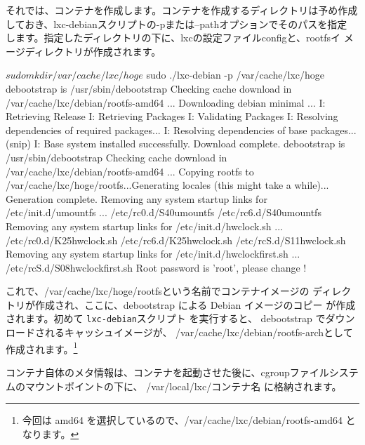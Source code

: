 \documentclass[mingoth,a4paper]{jsarticle}
\begin{document}
それでは、コンテナを作成します。コンテナを作成するディレクトリは予め作成
しておき、lxc-debianスクリプトの-pまたは--pathオプションでそのパスを指定
します。指定したディレクトリの下に、lxcの設定ファイルconfigと、rootfsイ
メージディレクトリが作成されます。

\begin{commandline}
$ sudo mkdir /var/cache/lxc/hoge
$ sudo ./lxc-debian -p /var/cache/lxc/hoge
debootstrap is /usr/sbin/debootstrap
Checking cache download in /var/cache/lxc/debian/rootfs-amd64 ... 
Downloading debian minimal ...
I: Retrieving Release
I: Retrieving Packages
I: Validating Packages
I: Resolving dependencies of required packages...
I: Resolving dependencies of base packages...
(snip)
I: Base system installed successfully.
Download complete.
debootstrap is /usr/sbin/debootstrap
Checking cache download in /var/cache/lxc/debian/rootfs-amd64 ... 
Copying rootfs to /var/cache/lxc/hoge/rootfs...Generating locales (this might take a while)...
Generation complete.
 Removing any system startup links for /etc/init.d/umountfs ...
   /etc/rc0.d/S40umountfs
   /etc/rc6.d/S40umountfs
 Removing any system startup links for /etc/init.d/hwclock.sh ...
   /etc/rc0.d/K25hwclock.sh
   /etc/rc6.d/K25hwclock.sh
   /etc/rcS.d/S11hwclock.sh
 Removing any system startup links for /etc/init.d/hwclockfirst.sh ...
   /etc/rcS.d/S08hwclockfirst.sh
Root password is 'root', please change !
\end{commandline}

これで、/var/cache/lxc/hoge/rootfsという名前でコンテナイメージの
ディレクトリが作成され、ここに、debootstrap による Debian イメージのコピー
が作成されます。初めて \texttt{lxc-debian}スクリプト を実行すると、
debootstrap でダウンロードされるキャッシュイメージが、
/var/cache/lxc/debian/rootfs-archとして作成されます。\footnote{今回は
amd64 を選択しているので、/var/cache/lxc/debian/rootfs-amd64 となります。}

コンテナ自体のメタ情報は、コンテナを起動させた後に、cgroupファイルシステムのマウントポイントの下に、
/var/local/lxc/コンテナ名 に格納されます。
\end{document}
